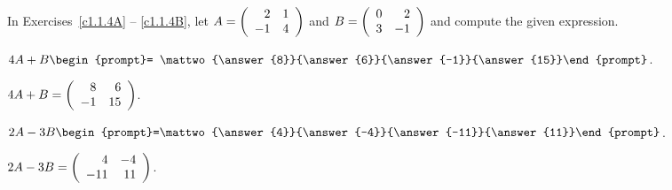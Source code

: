 \documentclass{ximera}
\begin{document}
\noindent In Exercises~\ref{c1.1.4A} -- \ref{c1.1.4B}, let
$A=\left(\begin{array}{rr} 2 & 1\\ -1 &4\end{array}\right)$ and $B=\left(\begin{array}{rr} 0 & 2\\ 3 &-1\end{array}\right)$ and compute the given 
expression.
\begin{exercise}\label{c1.1.4A}
  $4A+B\begin{prompt}= \mattwo{\answer{8}}{\answer{6}}{\answer{-1}}{\answer{15}}\end{prompt}$.

\begin{solution}
\ans $4A + B = \left(\begin{array}{rr} 8 & 6\\ -1 &15\end{array}\right)$.


\end{solution}
\end{exercise}
\begin{exercise}\label{c1.1.4B}
  $2A-3B\begin{prompt}=\mattwo{\answer{4}}{\answer{-4}}{\answer{-11}}{\answer{11}}\end{prompt}$.

\begin{solution}
\ans $2A - 3B = \left(\begin{array}{rr} 4 & -4\\ -11 &11\end{array}\right)$.




\end{solution}
\end{exercise}
\end{document}

